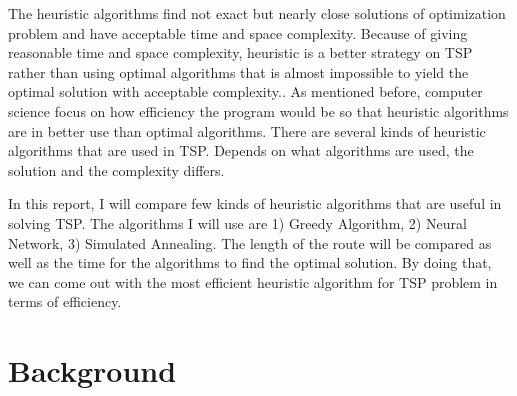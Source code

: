 \documentclass[12pt]{article}
\begin{document}
The heuristic algorithms find not exact but nearly close solutions of optimization problem and have acceptable time and space complexity.\cite{Heuristic} Because of giving reasonable time and space complexity, heuristic is a better strategy on TSP rather than using optimal algorithms that is almost impossible to yield the optimal solution with acceptable complexity.\cite{optimal}. As mentioned before, computer science focus on how efficiency the program would be so that heuristic algorithms are in better use than optimal algorithms. There are several kinds of heuristic algorithms that are used in TSP. Depends on what algorithms are used, the solution and the complexity differs. \par

In this report, I will compare few kinds of heuristic algorithms that are useful in solving TSP. The algorithms I will use are 1) Greedy Algorithm, 2) Neural Network, 3) Simulated Annealing. The length of the route will be compared as well as the time for the algorithms to find the optimal solution. By doing that, we can come out with the most efficient heuristic algorithm for TSP problem in terms of efficiency. 


\section{Background}
\end{document}
